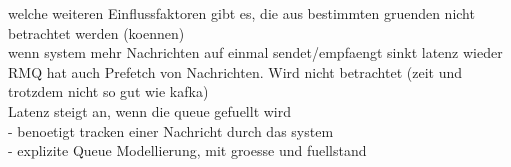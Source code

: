 welche weiteren Einflussfaktoren gibt es, die aus bestimmten gruenden nicht betrachtet werden (koennen)\\
wenn system mehr Nachrichten auf einmal sendet/empfaengt sinkt latenz wieder \\
RMQ hat auch Prefetch von Nachrichten. Wird nicht betrachtet (zeit und trotzdem nicht so gut wie kafka) \\
Latenz steigt an, wenn die queue gefuellt wird \\
- benoetigt tracken einer Nachricht durch das system \\
- explizite Queue Modellierung, mit groesse und fuellstand \\




